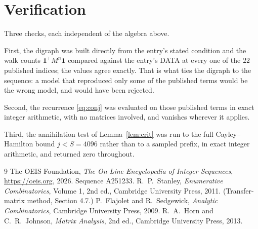 \documentclass[11pt,a4paper]{article}
\theoremstyle{plain}
\theoremstyle{definition}
\begin{document}
\section{Verification}

Three checks, each independent of the algebra above.

First, the digraph was built directly from the entry's stated condition and the walk counts
$\mathbf{1}^{\!\top}M^{n}\mathbf{1}$ compared against the entry's DATA at every one of
the $22$ published indices; the values agree exactly. That is what ties the digraph to
the sequence: a model that reproduced only some of the published terms would be the wrong
model, and would have been rejected.

Second, the recurrence \eqref{eq:conj} was evaluated on those published terms in exact
integer arithmetic, with no matrices involved, and vanishes wherever it applies.

Third, the annihilation test of Lemma~\ref{lem:crit} was run to the full Cayley--Hamilton
bound $j<S=4096$ rather than to a sampled prefix, in exact integer arithmetic, and returned
zero throughout.

\begin{thebibliography}{9}
 The OEIS Foundation, \emph{The On-Line Encyclopedia of Integer
Sequences}, \url{https://oeis.org}, 2026. Sequence A251233.
 R.~P.~Stanley, \emph{Enumerative Combinatorics}, Volume 1, 2nd ed.,
Cambridge University Press, 2011. (Transfer-matrix method, Section 4.7.)
 P.~Flajolet and R.~Sedgewick, \emph{Analytic Combinatorics}, Cambridge
University Press, 2009.
 R.~A.~Horn and C.~R.~Johnson, \emph{Matrix Analysis}, 2nd ed., Cambridge
University Press, 2013.
\end{thebibliography}
\end{document}
